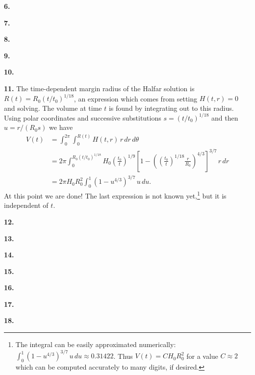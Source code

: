\documentclass[10pt]{amsart}
\newcommand{\prob}[1]{\bigskip\noindent\large\textbf{#1.}\normalsize }
\begin{document}
\prob{6}  

\prob{7}  

\prob{8}  

\prob{9}  

\prob{10}  

\prob{11}  The time-dependent margin radius of the Halfar solution is $R(t) = R_0 (t/t_0)^{1/18}$, an expression which comes from setting $H(t,r)=0$ and solving.  The volume at time $t$ is found by integrating out to this radius.  Using polar coordinates and successive substitutions $s = (t/t_0)^{1/18}$ and then $u=r/(R_0 s)$ we have
\begin{align*}
V(t) &= \int_0^{2\pi} \int_0^{R(t)} H(t,r) \,r\,dr\,d\theta \\
     &= 2\pi \int_0^{R_0 (t/t_0)^{1/18}} H_0 \left(\frac{t_0}{t}\right)^{1/9} \left[1 - \left(\left(\frac{t_0}{t}\right)^{1/18} \frac{r}{R_0}\right)^{4/3}\right]^{3/7} \,r\,dr \\
     &= 2\pi H_0 R_0^2 \int_0^1 \left(1 - u^{4/3}\right)^{3/7} \,u\,du.
\end{align*}
At this point we are done!  The last expression is not known yet,\footnote{The integral can be easily approximated numerically: $\int_0^1 (1 - u^{4/3})^{3/7} \,u\,du \approx 0.31422$.  Thus $V(t) = C H_0 R_0^2$ for a value $C\approx 2$ which can be computed accurately to many digits, if desired.} but it is independent of $t$.

\prob{12}  

\prob{13}  

\prob{14}  

\prob{15}  

\prob{16}  

\prob{17}  

\prob{18}  
\end{document}
